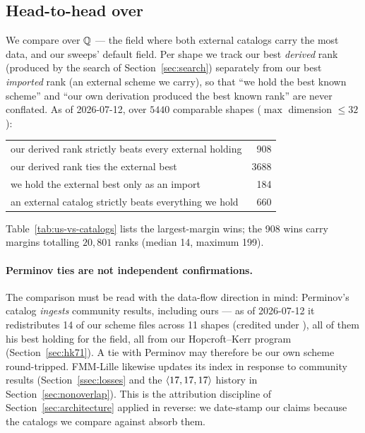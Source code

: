 \subsection{Head-to-head over \Rationals}\label{ssec:head-to-head}

We compare over \(\mathbb{Q}\) --- the field where both external
catalogs carry the most data, and our sweeps' default field. Per shape
we track our best \emph{derived} rank (produced by the search of
Section~\ref{sec:search}) separately from our best \emph{imported}
rank (an external scheme we carry), so that ``we hold the best known
scheme'' and ``our own derivation produced the best known rank'' are
never conflated. As of 2026-07-12, over \(5440\) comparable shapes
(\(\max\) dimension \(\le 32\)):

\begin{center}
\begin{tabular}{lr}
\toprule
our derived rank strictly beats every external holding & 908 \\
our derived rank ties the external best & 3688 \\
we hold the external best only as an import & 184 \\
an external catalog strictly beats everything we hold & 660 \\
\bottomrule
\end{tabular}
\end{center}

\noindent Table~\ref{tab:us-vs-catalogs} lists the largest-margin
wins; the 908 wins carry margins totalling \(20{,}801\) ranks (median
14, maximum 199).



\paragraph{Perminov ties are not independent confirmations.}
The comparison must be read with the data-flow direction in mind:
Perminov's catalog \emph{ingests} community results, including ours
--- as of 2026-07-12 it redistributes 14 of our scheme files across 11
shapes (credited under ), all of
them his best holding for the field, all from our Hopcroft--Kerr
program (Section~\ref{sec:hk71}). A tie with Perminov may therefore be
our own scheme round-tripped. FMM-Lille likewise updates its index in
response to community results (Section~\ref{ssec:losses} and the
\(\langle 17, 17, 17 \rangle\) history in Section~\ref{sec:nonoverlap}).
This is the attribution discipline of Section~\ref{sec:architecture}
applied in reverse: we date-stamp our claims because the catalogs we
compare against absorb them.

